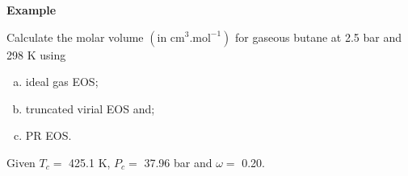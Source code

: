    \begin{MyExample}{\begin{center}{\bf Example}\end{center}}
     \begin{example}\label{Chapter:VolumetricPropertiesPureSubstances:Example4}
        Calculate the molar volume $\left(\text{in cm}^{3}.\text{mol}^{-1}\right)$ for gaseous butane at 2.5 bar and 298 K using
        \begin{enumerate}[a)]
           \item ideal gas EOS;
           \item truncated virial EOS and;
           \item PR EOS.
        \end{enumerate}
        Given $T_{c}=$ 425.1 K, $P_{c}=$ 37.96 bar and $\omega=$ 0.20.
     \end{example}

       

\end{MyExample}
